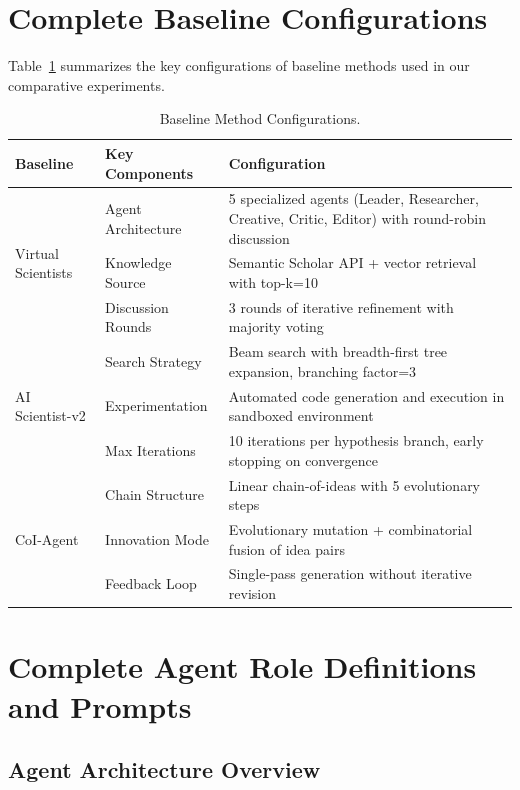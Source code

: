 \documentclass[runningheads]{llncs}
\begin{document}
\section{Complete Baseline Configurations}
\label{app:baseline_config}

Table~\ref{tab:baseline_configs} summarizes the key configurations of baseline methods used in our comparative experiments.

\begin{table}[h]
\centering
\small
\setlength{\tabcolsep}{4pt}
\begin{tabular}{lp{4cm}p{6cm}}
\toprule
\textbf{Baseline} & \textbf{Key Components} & \textbf{Configuration} \\
\midrule
\multirow{3}{*}{Virtual Scientists} 
 & Agent Architecture & 5 specialized agents (Leader, Researcher, Creative, Critic, Editor) with round-robin discussion \\
 & Knowledge Source & Semantic Scholar API + vector retrieval with top-k=10 \\
 & Discussion Rounds & 3 rounds of iterative refinement with majority voting \\
\midrule
\multirow{3}{*}{AI Scientist-v2} 
 & Search Strategy & Beam search with breadth-first tree expansion, branching factor=3 \\
 & Experimentation & Automated code generation and execution in sandboxed environment \\
 & Max Iterations & 10 iterations per hypothesis branch, early stopping on convergence \\
\midrule
\multirow{3}{*}{CoI-Agent} 
 & Chain Structure & Linear chain-of-ideas with 5 evolutionary steps \\
 & Innovation Mode & Evolutionary mutation + combinatorial fusion of idea pairs \\
 & Feedback Loop & Single-pass generation without iterative revision \\
\bottomrule
\end{tabular}
\caption{Baseline Method Configurations.}
\label{tab:baseline_configs}
\end{table}


\section{Complete Agent Role Definitions and Prompts}
\label{app:agent_prompts}

\subsection{Agent Architecture Overview}
\end{document}
